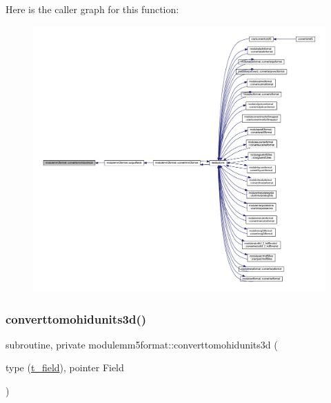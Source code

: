 Here is the caller graph for this function\+:\nopagebreak
\begin{figure}[H]
\begin{center}
\leavevmode
\includegraphics[width=350pt]{namespacemodulemm5format_a971d0306a569327363e6c98d9e1dd0c7_icgraph}
\end{center}
\end{figure}
\mbox{\label{namespacemodulemm5format_a0afd52db4648ea76112e242c40b31323}} 
\subsubsection{\texorpdfstring{converttomohidunits3d()}{converttomohidunits3d()}}
{\footnotesize\ttfamily subroutine, private modulemm5format\+::converttomohidunits3d (\begin{DoxyParamCaption}\item[{type (\mbox{\hyperlink{structmodulemm5format_1_1t__field}{t\+\_\+field}}), pointer}]{Field }\end{DoxyParamCaption})\hspace{0.3cm}{\ttfamily [private]}}

